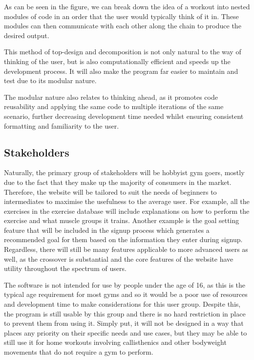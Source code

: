 \documentclass{article}
\begin{document}
As can be seen in the figure, we can break down the idea of a workout into nested modules of code in an order that the user would typically think of it in. These modules can then communicate with each other along the chain to produce the desired output. 

This method of top-design and decomposition is not only natural to the way of thinking of the user, but is also computationally efficient and speeds up the development process. It will also make the program far easier to maintain and test due to its modular nature. 

The modular nature also relates to thinking ahead, as it promotes code reusability and applying the same code to multiple iterations of the same scenario, further decreasing development time needed whilst ensuring consistent formatting and familiarity to the user. 

\subsection{Stakeholders}
Naturally, the primary group of stakeholders will be hobbyist gym goers, mostly due to the fact that they make up the majority of consumers in the market. Therefore, the website will be tailored to suit the needs of beginners to intermediates to maximise the usefulness to the average user. For example, all the exercises in the exercise database will include explanations on how to perform the exercise and what muscle groups it trains. Another example is the goal setting feature that will be included in the signup process which generates a recommended goal for them based on the information they enter during signup. Regardless, there will still be many features applicable to more advanced users as well, as the crossover is substantial and the core features of the website have utility throughout the spectrum of users.

The software is not intended for use by people under the age of 16, as this is the typical age requirement for most gyms and so it would be a poor use of resources and development time to make considerations for this user group. Despite this, the program is still usable by this group and there is no hard restriction in place to prevent them from using it. Simply put, it will not be designed in a way that places any priority on their specific needs and use cases, but they may be able to still use it for home workouts involving callisthenics and other bodyweight movements that do not require a gym to perform. 
\end{document}
